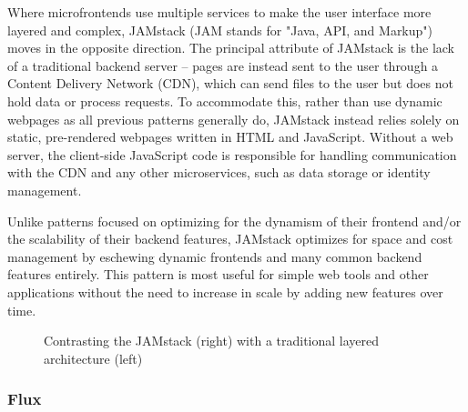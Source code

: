 Where microfrontends use multiple services to make the user interface more layered and complex, JAMstack (JAM stands for "Java, API, and Markup") moves in the opposite direction. The principal attribute of JAMstack is the lack of a traditional backend server -- pages are instead sent to the user through a Content Delivery Network (CDN), which can send files to the user but does not hold data or process requests. To accommodate this, rather than use dynamic webpages as all previous patterns generally do, JAMstack instead relies solely on static, pre-rendered webpages written in HTML and JavaScript. Without a web server, the client-side JavaScript code is responsible for handling communication with the CDN and any other microservices, such as data storage or identity management.

Unlike patterns focused on optimizing for the dynamism of their frontend and/or the scalability of their backend features, JAMstack optimizes for space and cost management by eschewing dynamic frontends and many common backend features entirely. This pattern is most useful for simple web tools and other applications without the need to increase in scale by adding new features over time.

\begin{figure}[!ht]
	\begin{center}
		\caption[Contrasting the JAMstack with traditional layered architecture]{Contrasting the JAMstack (right) with a traditional layered architecture (left)}\label{jamstack}
	\end{center}
\end{figure}

\subsubsection{Flux}

